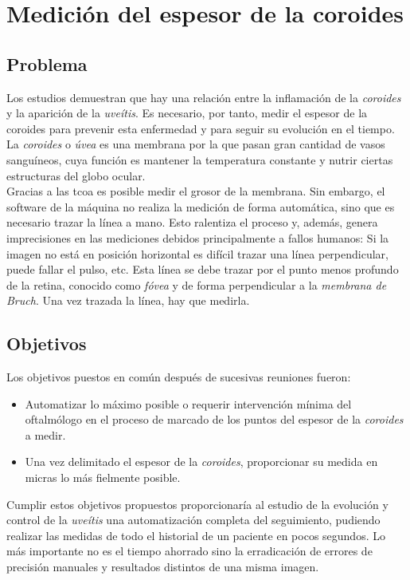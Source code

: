 \chapter{Medición del espesor de la coroides}
\section{Problema}
Los estudios demuestran que hay una relación
entre la inflamación de la \emph{coroides}
y la aparición de la \emph{uveítis}. Es 
necesario, por tanto, medir el espesor de
la coroides para prevenir esta enfermedad
y para seguir su evolución en el tiempo.\\
La \emph{coroides} o \emph{úvea} es una 
membrana por la que pasan gran cantidad de 
vasos sanguíneos, cuya función es mantener 
la temperatura constante y nutrir ciertas 
estructuras del globo ocular. \\
Gracias a las \gls{tcoa} es posible medir 
el grosor de la membrana. Sin embargo, 
el software de la máquina no realiza la 
medición de forma automática, sino que es 
necesario trazar la línea a mano. Esto 
ralentiza el proceso y, además, 
genera imprecisiones en las mediciones 
debidos principalmente a fallos humanos: 
Si la imagen no está en posición horizontal
es difícil trazar una línea perpendicular, 
puede fallar el pulso, etc. Esta línea se 
debe trazar por el punto menos profundo 
 de la retina, conocido como 
\emph{fóvea} y de forma perpendicular a la  
\emph{membrana de Bruch}. Una vez trazada la 
línea, hay que medirla.


\section{Objetivos}
Los objetivos puestos en común después de sucesivas reuniones fueron:
\begin{itemize}
\item Automatizar lo máximo posible o requerir intervención mínima del
  oftalmólogo en el proceso de marcado de los puntos del espesor de la
  \emph{coroides} a medir.
\item Una vez delimitado el espesor de la \emph{coroides}, proporcionar su
  medida en micras lo más fielmente posible.
\end{itemize}
Cumplir estos objetivos propuestos proporcionaría al estudio de la
evolución y control de la \emph{uveítis} una automatización completa
del seguimiento, pudiendo realizar las medidas de todo el historial
de un paciente en pocos segundos. Lo más importante no es el tiempo
ahorrado sino la erradicación de errores de precisión manuales y
resultados distintos de una misma imagen.

